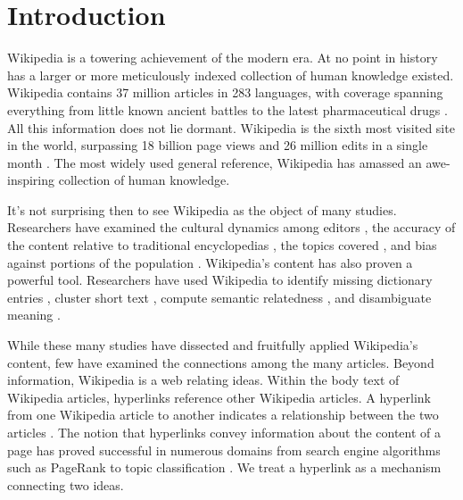 \documentclass[pre,twocolumn,twoside,superscriptaddress,floatfix, aps, 10pt]{revtex4-1}
\begin{document}
\maketitle



\section{Introduction}

Wikipedia is a towering achievement of the modern era. 
At no point in history has a larger or more meticulously indexed collection of human knowledge 
existed.
Wikipedia contains 37 million articles in 283 languages, 
with coverage spanning everything from little known ancient battles to the latest pharmaceutical drugs 
\cite{drugs} 
\cite{stats}.
All this information does not lie dormant. 
Wikipedia is the sixth most visited
site in the world, surpassing 18 billion page views and 26 million edits in a single month
\cite{wiki_edits}
\cite{wiki_views}.
The most widely used general reference, Wikipedia has amassed an awe-inspiring collection of human knowledge.

It's not surprising then to see Wikipedia as the object of many studies. 
Researchers have examined the cultural dynamics among editors
\cite{editors},
the accuracy of the content relative to traditional encyclopedias
\cite{accuracy1}
\cite{accuracy2},
the topics covered 
\cite{coverage},
and bias against portions of the population
\cite{bias_women}.
Wikipedia's content has also proven a powerful tool. 
Researchers have used Wikipedia to identify missing dictionary entries
\cite{missing_entries},
cluster short text
\cite{clustering},
compute semantic relatedness
\cite{semantic_relatedness},
and disambiguate meaning \cite{disambiguating}.

While these many studies have dissected and fruitfully applied Wikipedia's content,
few have examined the connections among the many articles.
Beyond information, Wikipedia is a web 
relating ideas. 
Within the body text of Wikipedia articles, hyperlinks reference
other Wikipedia articles.
A hyperlink from one Wikipedia article to another
indicates a relationship between the two articles
\cite{relevance}.
The notion that hyperlinks convey information about the content of a
page has proved successful in numerous domains from search engine algorithms 
such as PageRank 
\cite{pagerank} 
to topic classification
\cite{classifier}.
We treat a hyperlink as a mechanism connecting two ideas. 
\end{document}
